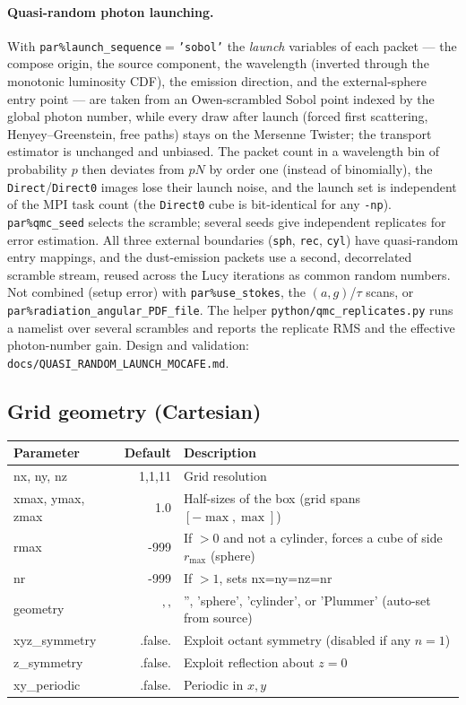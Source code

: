 \documentclass[english,a4paper]{kiseon_memo}
\newcommand{\pp}[1]{\texttt{par\%#1}}
\newcommand{\code}[1]{\texttt{#1}}
\newcommand{\file}[1]{\texttt{#1}}
\begin{document}
\paragraph{Quasi-random photon launching.}  With
\pp{launch\_sequence}${}=$\code{'sobol'} the \emph{launch} variables of each
packet --- the compose origin, the source component, the wavelength
(inverted through the monotonic luminosity CDF), the emission
direction, and the external-sphere entry point --- are taken from an
Owen-scrambled Sobol point indexed by the global photon number, while every
draw after launch (forced first scattering, Henyey--Greenstein, free paths)
stays on the Mersenne Twister; the transport estimator is unchanged and
unbiased.  The packet count in a wavelength bin of probability $p$ then
deviates from $pN$ by order one (instead of binomially), the
\code{Direct}/\code{Direct0} images lose their launch noise, and the launch
set is independent of the MPI task count (the \code{Direct0} cube is
bit-identical for any \code{-np}).  \pp{qmc\_seed} selects the scramble;
several seeds give independent replicates for error estimation.  All three
external boundaries (\code{sph}, \code{rec}, \code{cyl}) have quasi-random
entry mappings, and the dust-emission packets use a second, decorrelated
scramble stream, reused across the Lucy iterations as common random numbers.
Not combined (setup error) with \pp{use\_stokes}, the $(a,g)$/$\tau$ scans, or
\pp{radiation\_angular\_PDF\_file}.  The helper
\file{python/qmc\_replicates.py} runs a namelist over several scrambles and
reports the replicate RMS and the effective photon-number gain.  Design and
validation: \file{docs/QUASI\_RANDOM\_LAUNCH\_MOCAFE.md}.

\subsection{Grid geometry (Cartesian)}
\begin{longtable}{P D X}
\toprule
\textrm{Parameter} & \textrm{Default} & \textrm{Description}\\
\midrule \endhead
nx, ny, nz         & 1,1,11 & Grid resolution\\
xmax, ymax, zmax   & 1.0    & Half-sizes of the box (grid spans $[-\max,\max]$)\\
rmax               & -999   & If $>0$ and not a cylinder, forces a cube of side $r_{\max}$ (sphere)\\
nr                 & -999   & If $>1$, sets nx=ny=nz=nr\\
geometry           & '\,'   & '', 'sphere', 'cylinder', or 'Plummer' (auto-set from source)\\
xyz\_symmetry      & .false.& Exploit octant symmetry (disabled if any $n=1$)\\
z\_symmetry        & .false.& Exploit reflection about $z=0$\\
xy\_periodic       & .false.& Periodic in $x,y$\\
\bottomrule
\end{longtable}
\end{document}
